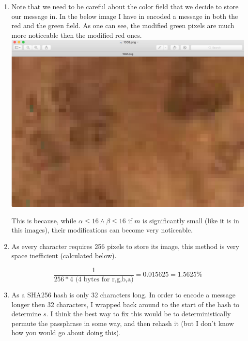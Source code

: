 \documentclass{article}
\begin{document}
\begin{enumerate}
	\item Note that we need to be careful about the color field that we decide to store our message in.  In the below image I have in encoded a message in both the red and the green field. As one can see, the modified green pixels are much more noticeable then the modified red ones. \includegraphics[width=\textwidth]
{greenvred.jpg}
	
	This is because, while $\alpha \leq 16 \land \beta \leq 16$ if $m$ is significantly small (like it is in this images), their modifications can become very noticeable.
	\item As every character requires 256 pixels to store its image, this method is very space inefficient (calculated below).
	
	$$\frac{1}{256*4 \text{ (4 bytes for r,g,b,a)}} = 0.015625 = 1.5625\%$$

	\item As a SHA256 hash is only 32 characters long. In order to encode a message longer then 32 characters, I wrapped back around to the start of the hash to determine $s$. I think the best way to fix this would be to deterministically permute the passphrase in some way, and then rehash it (but I don't know how you would go about doing this).

\end{enumerate}
\end{document}
